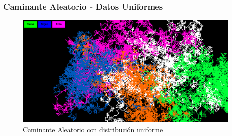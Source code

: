 \begin{frame}
	\frametitle{Caminante Aleatorio - Datos Uniformes}
	\begin{figure}
		\centering
		\includegraphics[width=\textwidth]{walkerUniforme} %
		\caption{Caminante Aleatorio con distribución uniforme}
	\end{figure}
\end{frame}

